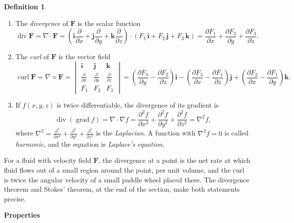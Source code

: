 \documentclass[11pt,a4paper]{article}
\DeclareMathOperator{\grad}{grad}
\DeclareMathOperator{\dive}{div}
\DeclareMathOperator{\curl}{curl}
\theoremstyle{definition}
\newtheorem{defn}[thm]{Definition}
\newcommand{\subhead}[1]{%
  \par\medskip\noindent\textbf{#1}\par\nobreak\smallskip}
\begin{document}
\begin{defn}
\label{defn:divcurl}
\begin{enumerate}
\item The \emph{divergence} of $\mathbf F$ is the scalar function
\[\dive \mathbf F = \nabla\cdot \mathbf F = \left(\mathbf i\frac{\partial}
{\partial x} + \mathbf j\frac{\partial}{\partial y} + \mathbf k\frac{\partial}
{\partial z}\right)\cdot(F_1\,\mathbf i + F_2\,\mathbf j + F_3\,\mathbf k) =
\frac{\partial F_1}{\partial x} + \frac{\partial F_2}{\partial y} +
\frac{\partial F_3}{\partial z} .\]

\item The \emph{curl} of $\mathbf F$ is the vector field
\[\curl \mathbf F = \nabla \times \mathbf F =
\begin{vmatrix}
\mathbf i & \mathbf j & \mathbf k\\[1ex]
\frac{\partial}{\partial x} & \frac{\partial}{\partial y} & \frac{\partial
}{\partial z}\\[1ex]
F_1 & F_2 & F_3
\end{vmatrix} = \left( \frac{\partial F_3}{\partial y}-\frac{\partial
F_2}{\partial z}\right)\mathbf i - \left(\frac{\partial F_3}{\partial
x}-\frac{\partial F_1}{\partial z}\right) \mathbf j + \left(\frac{\partial F_2
}{\partial x}-\frac{\partial F_1}{\partial y}\right) \mathbf k .\]

\item If $f(x,y,z)$ is twice differentiable, the divergence of its gradient is
\[\dive (\grad f) = \nabla\cdot\nabla f = \frac{\partial^2 f}{\partial x^2} +
\frac{\partial^2 f}{\partial y^2}+ \frac{\partial^2f}{\partial z^2} =
\nabla^2f ,\]
where $\nabla^2 = \frac{\partial^2}{\partial x^2}+ \frac{\partial^2}{\partial
y^2} + \frac{\partial^2}{\partial z^2}$ is the \emph{Laplacian}. A function with
$\nabla^2f=0$ is called \emph{harmonic}, and the equation is \emph{Laplace's
equation}.
\end{enumerate}
\end{defn}

For a fluid with velocity field $\mathbf F$, the divergence at a point is the
net rate at which fluid flows out of a small region around the point, per unit
volume, and the curl is twice the angular velocity of a small paddle wheel
placed there. The divergence theorem and Stokes' theorem, at the end of the
section, make both statements precise.

\subhead{Properties}
\end{document}
